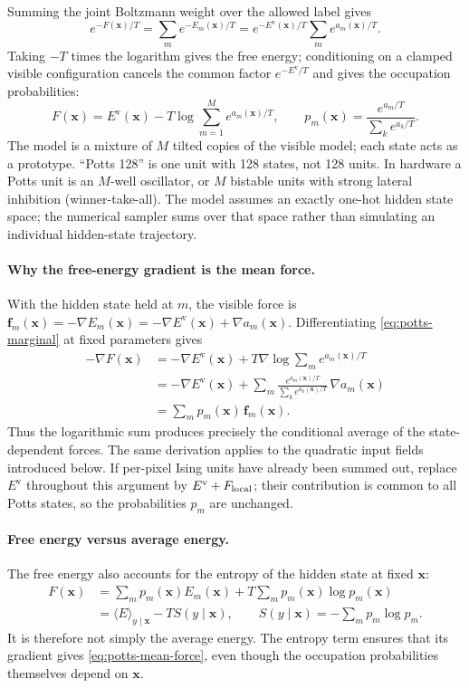 \documentclass[11pt,a4paper]{article}
\newcommand{\vx}{\bm{x}}
\newcommand{\Ev}{E^{\mathrm{v}}}
\newcommand{\grad}{\nabla}
\begin{document}
Summing the joint Boltzmann weight over the allowed label gives
\begin{equation*}
  e^{-F(\vx)/T}=\sum_m e^{-E_m(\vx)/T}
  =e^{-\Ev(\vx)/T}\sum_m e^{a_m(\vx)/T}.
\end{equation*}
Taking $-T$ times the logarithm gives the free energy; conditioning on a clamped visible configuration cancels
the common factor $e^{-\Ev/T}$ and gives the occupation probabilities:
\begin{equation}
  F(\vx)=\Ev(\vx)-T\log\sum_{m=1}^Me^{a_m(\vx)/T},\qquad p_m(\vx)=\frac{e^{a_m/T}}{\sum_ke^{a_k/T}} .
  \label{eq:potts-marginal}
\end{equation}
The model is a mixture of $M$ tilted copies of the visible model; each state acts as a prototype. ``Potts 128'' is
one unit with 128 states, not 128 units. In hardware a Potts unit is an $M$-well oscillator, or $M$ bistable units
with strong lateral inhibition (winner-take-all). The model assumes an exactly one-hot hidden state space;
the numerical sampler sums over that space rather than simulating an individual hidden-state trajectory.

\paragraph{Why the free-energy gradient is the mean force.} With the hidden state held at $m$, the visible
force is $\bm f_m(\vx)=-\grad E_m(\vx)=-\grad\Ev(\vx)+\grad a_m(\vx)$. Differentiating
\eqref{eq:potts-marginal} at fixed parameters gives
\begin{align}
  -\grad F(\vx)
  &=-\grad\Ev(\vx)+T\grad\log\sum_m e^{a_m(\vx)/T}\nonumber\\
  &=-\grad\Ev(\vx)+\sum_m\frac{e^{a_m(\vx)/T}}{\sum_k e^{a_k(\vx)/T}}\,\grad a_m(\vx)\nonumber\\
  &=\sum_m p_m(\vx)\,\bm f_m(\vx).
  \label{eq:potts-mean-force}
\end{align}
Thus the logarithmic sum produces precisely the conditional average of the state-dependent forces. The same
derivation applies to the quadratic input fields introduced below. If per-pixel Ising units have already been
summed out, replace $\Ev$ throughout this argument by $\Ev+F_{\rm local}$; their contribution is common to all
Potts states, so the probabilities $p_m$ are unchanged.

\paragraph{Free energy versus average energy.} The free energy also accounts for the entropy of the hidden
state at fixed $\vx$:
\begin{equation}
  \begin{aligned}
    F(\vx)&=\sum_m p_m(\vx)E_m(\vx)+T\sum_m p_m(\vx)\log p_m(\vx)\\
    &=\langle E\rangle_{y\mid\vx}-T S(y\mid\vx),\qquad
    S(y\mid\vx)=-\sum_m p_m\log p_m.
  \end{aligned}
  \label{eq:potts-entropy}
\end{equation}
It is therefore not simply the average energy. The entropy term ensures that its gradient gives
\eqref{eq:potts-mean-force}, even though the occupation probabilities themselves depend on $\vx$.
\end{document}
